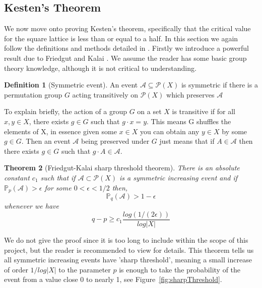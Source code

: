 \documentclass[a4paper,11pt]{article}
\newtheorem{theorem}{Theorem}[section]
\theoremstyle{definition}
\newtheorem{definition}[theorem]{Definition}
\newcommand{\prob}{\mathbb{P}_p}
\begin{document}
\subsection{Kesten's Theorem}
We now move onto proving Kesten's theorem, specifically that the critical value for the square lattice is less than or equal to a half. In this section we again follow the definitions and methods detailed in \cite{bollobas2006short}. Firstly we introduce a powerful result due to Friedgut and Kalai \cite{friedgut1996every}.
We assume the reader has some basic group theory knowledge, although it is not critical to understanding.

\begin{definition}[Symmetric event]
	An event $\mathcal{A} \subseteq \mathcal{P}(X)$ is symmetric if there is a permutation group  $G$ acting transitively on $\mathcal{P}(X)$ which preserves $\mathcal{A}$
\end{definition}
 To explain briefly, the action of a group $G$ on a set $X$ is transitive if for all $x,y \in X$, there exists $g \in G$ such that $g \cdot  x = y$. This means G shuffles the elements of X, in essence given some $x \in X$ you can obtain any $y \in X$ by some $g \in G$. Then an event $\mathcal{A}$ being preserved under $G$ just means that if $A \in \mathcal{A}$ then there exists $g \in G$ such that $g \cdot A \in \mathcal{A}$. 


\begin{theorem}[Friedgut-Kalai sharp threshold theorem]\label{sharpThreshold}
	There is an absolute constant $c_1$ such that if $\mathcal{A} \subset \mathcal{P}(X)$ is a symmetric increasing event and if $\prob(\mathcal{A}) > \epsilon$ for some $0 < \epsilon < 1/2$ then, 
	$$\mathbb{P}_q(\mathcal{A}) > 1 - \epsilon$$
	whenever we have 
	$$q - p \geq c_1 \frac{log(1/(2\epsilon))}{log |X|}$$
\end{theorem}

We do not give the proof since it is too long to include within the scope of this project, but the reader is recommended to view \cite{friedgut1996every} for details. This theorem tells us all symmetric increasing events have 'sharp threshold', meaning a small increase of order $1/log|X|$ to the parameter $p$ is enough to take the probability of the event from a value close 0 to nearly 1, see Figure~\ref*{fig:sharpThreshold}.
\end{document}

